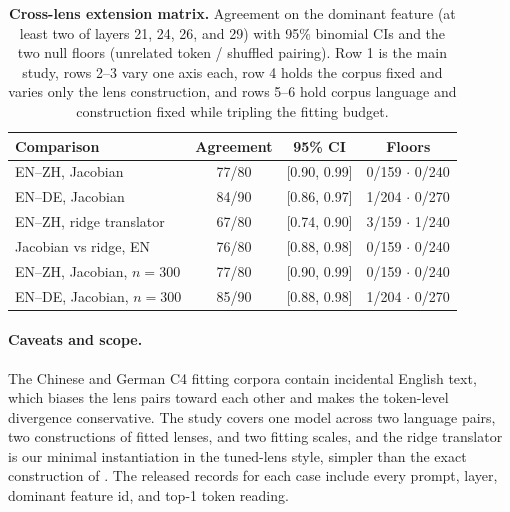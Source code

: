 \begin{table}[!tbp]
\caption{\textbf{Cross-lens extension matrix.} Agreement on the dominant
feature (at least two of layers 21, 24, 26, and 29) with 95\% binomial CIs and the
two null floors (unrelated token / shuffled pairing). Row 1
is the main study, rows 2--3 vary one axis each, row 4 holds the corpus
fixed and varies only the lens construction, and rows 5--6 hold corpus
language and construction fixed while tripling the fitting budget.}
\label{tab:app-cross-lens-extension}
\centering
\scriptsize
\setlength{\tabcolsep}{4.0pt}
\renewcommand{\arraystretch}{1.08}
\begin{tabularx}{\linewidth}{@{}>{\RaggedRight\arraybackslash}Xccc@{}}
\toprule
Comparison & Agreement & 95\% CI & Floors \\
\midrule
EN--ZH, Jacobian & 77/80 & [0.90, 0.99] & 0/159 \(\cdot\) 0/240 \\
EN--DE, Jacobian & 84/90 & [0.86, 0.97] & 1/204 \(\cdot\) 0/270 \\
EN--ZH, ridge translator & 67/80 & [0.74, 0.90] & 3/159 \(\cdot\) 1/240 \\
Jacobian vs ridge, EN & 76/80 & [0.88, 0.98] & 0/159 \(\cdot\) 0/240 \\
EN--ZH, Jacobian, \(n{=}300\) & 77/80 & [0.90, 0.99] & 0/159 \(\cdot\) 0/240 \\
EN--DE, Jacobian, \(n{=}300\) & 85/90 & [0.88, 0.98] & 1/204 \(\cdot\) 0/270 \\
\bottomrule
\end{tabularx}
\end{table}

\paragraph{Caveats and scope.}
The Chinese and German C4 fitting corpora contain incidental English
text, which biases the lens pairs toward each other and makes the
token-level divergence conservative. The study covers one model
across two language pairs, two constructions of fitted lenses, and two
fitting scales, and the ridge translator is our minimal instantiation in
the tuned-lens style, simpler than the exact construction of
\citet{belrose2023tuned}. The released records for each case
include every prompt, layer, dominant feature id, and top-1 token reading.
